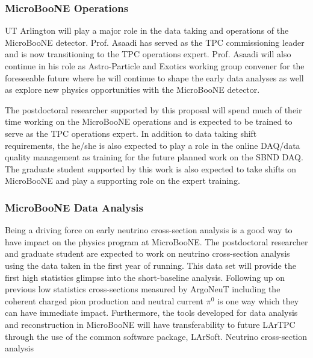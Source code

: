 \subsubsection{MicroBooNE Operations}\label{sec:UbooneOperations}
UT Arlington will play a major role in the data taking and operations of the MicroBooNE detector. Prof. Asaadi has served as the TPC commissioning leader and is now transitioning to the TPC operations expert. Prof. Asaadi will also continue in his role as Astro-Particle and Exotics working group convener for the foreseeable future where he will continue to shape the early data analyses as well as explore new physics opportunities with the MicroBooNE detector.

The postdoctoral researcher supported by this proposal will spend much of their time working on the MicroBooNE operations and is expected to be trained to serve as the TPC operations expert. In addition to data taking shift requirements, the he/she is also expected to play a role in the online DAQ/data quality management as training for the future planned work on the SBND DAQ. The graduate student supported by this work is also expected to take shifts on MicroBooNE and play a supporting role on the expert training.


\subsubsection{MicroBooNE Data Analysis}\label{sec:UbooneDataAnalysis}
Being a driving force on early neutrino cross-section analysis is a good way to have impact on the physics program at MicroBooNE. The postdoctoral researcher and graduate student are expected to work on neutrino cross-section analysis using the data taken in the first year of running. This data set will provide the first high statistics glimpse into the short-baseline analysis. Following up on previous low statistics cross-sections measured by ArgoNeuT including the coherent charged pion production and neutral current $\pi^{0}$ is one way which they can have immediate impact. Furthermore, the tools developed for data analysis and reconstruction in MicroBooNE will have transferability to future LArTPC through the use of the common software package, LArSoft.
Neutrino cross-section analysis
